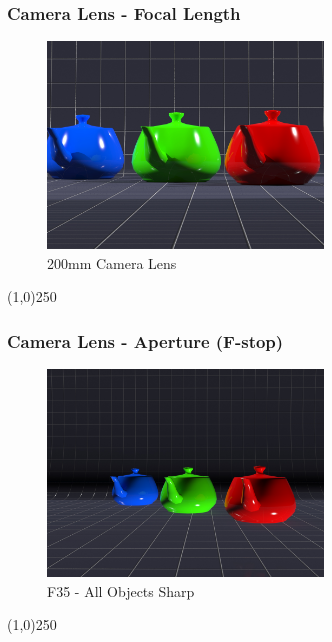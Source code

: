 \begin{frame}
\frametitle{Camera Lens - Focal Length}
\begin{figure}
	\centering
	\includegraphics[height=5.5cm]{img/Cameras/200mm.jpg}
	\caption[200mm Camera Lens]{200mm Camera Lens}
	\label{fig:200mm}
\end{figure}
\end{frame}
\begin{center}\line(1,0){250}\end{center}



\begin{frame}
\frametitle{Camera Lens - Aperture (F-stop)}
\begin{figure}
	\centering
	\includegraphics[height=5.5cm]{img/Cameras/F35Teapots.jpg}
	\caption[F35 - All Objects Sharp]{F35 - All Objects Sharp}
	\label{fig:F35}
\end{figure}
\end{frame}
\begin{center}\line(1,0){250}\end{center}



